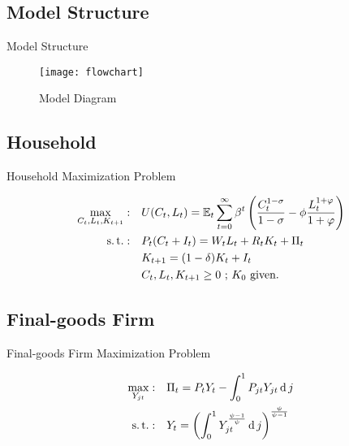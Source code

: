 \documentclass[../quali_slides.tex]{subfiles}
\begin{document}

	\subsection{Model Structure}

	\begin{frame}{Model Structure}
		
		\begin{figure}[h!]
		\centering
		\texttt{[image: flowchart]}
		\caption{Model Diagram}
		\label{fig:model-diagram}
		\end{figure}	
		
	\end{frame}


\subsection{Household}

\begin{frame}{Household Maximization Problem}
	
	\begin{align}
		\label{eq:household-utility-function}
		\max_{C_t,L_t,K_{t+1}}: \quad & U(C_t,L_t) = {\mathbb{E}_{t}} \sum_{t=0}^{\infty} \beta^t \left(\frac{C_t^{1-\sigma}}{1-\sigma} - \phi \frac{L_t^{1+\varphi}}{1+\varphi} \right) \\
		\label{eq:household-budget-constraint}
		\operatorname{s.t.}: \quad & P_t (C_t + I_t) = W_t L_t + R_t K_t + \Pi_t \\
		\label{eq:law-of-motion-for-capital}
		\quad & K_{t+1} = (1-\delta)K_t + I_t \\
		\quad & C_t,L_t,K_{t+1} \geq 0 \text{ ; $K_0$ given.} \nonumber
	\end{align}
	
\end{frame}


\subsection{Final-goods Firm}

	\begin{frame}{Final-goods Firm Maximization Problem}
	
	\begin{align}
		\label{eq:final-good-firm-max-problem}
		\max_{Y_{jt}}: &\quad \Pi_t = P_t Y_t - \int_{0}^{1} P_{jt} Y_{jt} \operatorname{d} j\\
		\label{eq:final-good-firm-bundle-rule}
		\operatorname{s.t.}: & \quad Y_t = \left( \int_{0}^{1} Y_{jt}^{\frac{\psi-1}{\psi}} \operatorname{d} j \right)^{\frac{\psi}{\psi-1}}
	\end{align}
	
	
	\end{frame}
\end{document}
